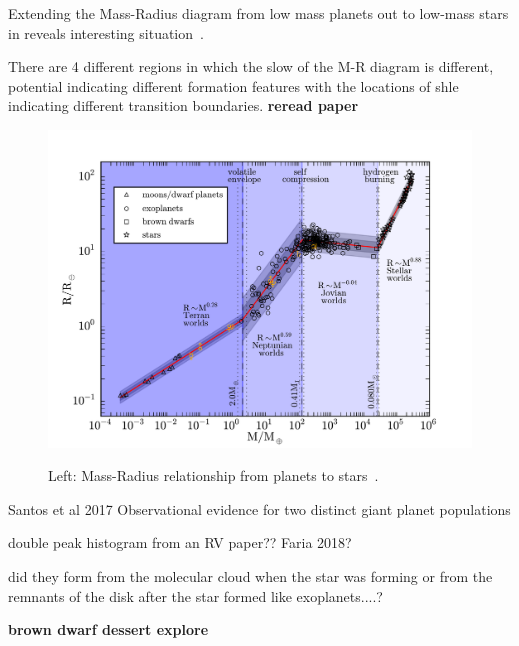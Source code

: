 Extending the Mass-Radius diagram from low mass planets out to low-mass stars in  reveals interesting situation~\citet{chen_probabilistic_2016}.

There are 4 different regions in which the slow of the M-R diagram is different, potential indicating different formation features with the locations of shle indicating different transition boundaries. \textbf{reread paper} 

\begin{figure}[t]
    \centering
    \includegraphics[width=0.9\linewidth]{./figures/introduction/mass_radius_relation.pdf}  \\
    \caption{Left: Mass-Radius relationship from planets to stars~\citet{chen_probabilistic_2016}.}
    \label{fig:mass_radius_relation}
\end{figure}


\citep{santos_observational_2017} Santos et al 2017   Observational evidence for two distinct giant planet populations





double peak histogram from an {RV} paper?? Faria 2018?


did they form from the molecular cloud when the star was forming or from the remnants of the disk after the star formed like exoplanets....?






\textbf{brown dwarf dessert explore \citet{ranc_moa2007blg197_2015}}


